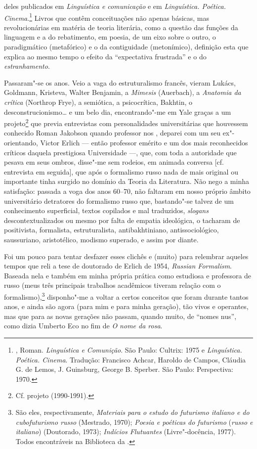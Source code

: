 deles publicados em \emph{Linguística e comunicação} e em
\emph{Linguística. Poética. Cinema}.\footnote{, Roman.
 \emph{Linguística e Comunição}. São Paulo: Cultrix: 1975 e
 \emph{Linguística. Poética. Cinema}. Tradução: Francisco Achcar, 
Haroldo de Campos, Cláudia G. de Lemos, J. Guinsburg, George B.
 Sperber. São Paulo: Perspectiva: 1970.} Livros que contêm conceituações
não apenas básicas, mas revolucionárias em matéria de teoria literária,
como a questão das funções da linguagem e a do rebatimento, em poesia, de
um eixo sobre o outro, o paradigmático (metafórico) e o da contiguidade
(metonímico), definição esta que explica ao mesmo tempo o efeito da
``expectativa frustrada'' e o do \emph{estranhamento}.

Passaram"-se os anos. Veio a vaga do estruturalismo francês, vieram
Lukács, Goldmann, Kristeva, Walter Benjamin, a \emph{Mimesis} (Auerbach), a
\emph{Anatomia da crítica} (Northrop Frye), a semiótica, a psicocrítica, Bakhtin, o
desconstrucionismo\ldots{} e um belo dia, encontrando"-me em Yale graças a um
projeto\footnote{Cf. projeto  (1990-1991).} que previa
entrevistas com personalidades universitárias que houvessem conhecido
Roman Jakobson quando professor nos , deparei com um seu
ex"-orientando,  Victor Erlich --- então professor emérito e um dos mais
reconhecidos críticos daquela prestigiosa Universidade ---, que, com toda
a autoridade que pesava em seus ombros, disse"-me sem rodeios, em animada
conversa [cf. entrevista em seguida], que após o formalismo russo nada de mais
original ou importante tinha surgido no domínio da Teoria da Literatura.
Não nego a minha satisfação: passada a voga dos anos 60--70, não faltaram
em nosso próprio âmbito universitário detratores do formalismo russo
que, bastando"-se talvez de um conhecimento superficial, textos
copilados e mal traduzidos, \emph{slogans} descontextualizados ou mesmo por
falta de empatia ideológica, o tacharam de positivista, formalista,
estruturalista, antibakhtiniano, antissociológico, saussuriano,
aristotélico, modismo superado, e assim por diante.

Foi um pouco para tentar desfazer esses clichês e (muito) para relembrar aqueles tempos
que reli a tese de doutorado de Erlich de 1954, \emph{Russian
Formalism}. Baseada nela e também em minha própria prática como
estudiosa e professora de russo (meus três principais trabalhos
acadêmicos tiveram relação com o formalismo),\footnote{São eles,
  respectivamente, \emph{Materiais para o estudo do futurismo italiano e
  do cubofuturismo russo} (Mestrado, 1970); \emph{Poesia e poéticas do
  futurismo} (\emph{russo e italiano}) (Doutorado, 1973); \emph{Indícios
  Flutuantes} (Livre"-docência, 1977). Todos encontráveis na Biblioteca
  da .} disponho"-me a voltar a certos conceitos que foram durante
tantos anos, e ainda são agora (para mim e para minha geração), tão
vivos e operantes, mas que para as novas gerações não passam, quando
muito, de ``nomes nus'', como dizia Umberto Eco no fim de \emph{O nome
da rosa}.



